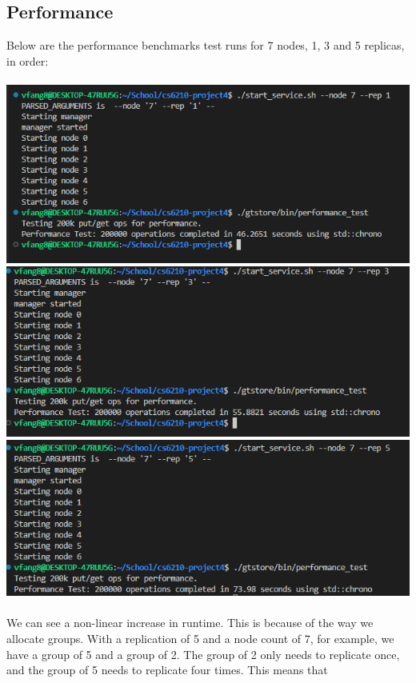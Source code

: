 \documentclass{article}
\begin{document}
\subsection{Performance}
Below are the performance benchmarks test runs for 7 nodes, 1, 3 and 5 replicas, in order:\\\\
\includegraphics[width=\linewidth]{img/Performance71.png}\\
\includegraphics[width=\linewidth]{img/Performance73.png}\\
\includegraphics[width=\linewidth]{img/Performance75.png}\\\\
We can see a non-linear increase in runtime. This is because of the way we allocate groups. With a replication of 5 and a node count of 7, for example,
we have a group of 5 and a group of 2. The group of 2 only needs to replicate once, and the group of 5 needs to replicate four times. This means that 
\end{document}

